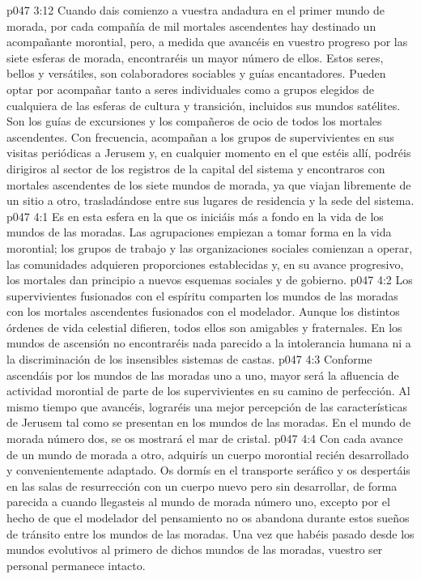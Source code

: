 \vs p047 3:12 Cuando dais comienzo a vuestra andadura en el primer mundo de morada, por cada compañía de mil mortales ascendentes hay destinado un acompañante morontial, pero, a medida que avancéis en vuestro progreso por las siete esferas de morada, encontraréis un mayor número de ellos. Estos seres, bellos y versátiles, son colaboradores sociables y guías encantadores. Pueden optar por acompañar tanto a seres individuales como a grupos elegidos de cualquiera de las esferas de cultura y transición, incluidos sus mundos satélites. Son los guías de excursiones y los compañeros de ocio de todos los mortales ascendentes. Con frecuencia, acompañan a los grupos de supervivientes en sus visitas periódicas a Jerusem y, en cualquier momento en el que estéis allí, podréis dirigiros al sector de los registros de la capital del sistema y encontraros con mortales ascendentes de los siete mundos de morada, ya que viajan libremente de un sitio a otro, trasladándose entre sus lugares de residencia y la sede del sistema.
\vs p047 4:1 Es en esta esfera en la que os iniciáis más a fondo en la vida de los mundos de las moradas. Las agrupaciones empiezan a tomar forma en la vida morontial; los grupos de trabajo y las organizaciones sociales comienzan a operar, las comunidades adquieren proporciones establecidas y, en su avance progresivo, los mortales dan principio a nuevos esquemas sociales y de gobierno.
\vs p047 4:2 Los supervivientes fusionados con el espíritu comparten los mundos de las moradas con los mortales ascendentes fusionados con el modelador. Aunque los distintos órdenes de vida celestial difieren, todos ellos son amigables y fraternales. En los mundos de ascensión no encontraréis nada parecido a la intolerancia humana ni a la discriminación de los insensibles sistemas de castas.
\vs p047 4:3 Conforme ascendáis por los mundos de las moradas uno a uno, mayor será la afluencia de actividad morontial de parte de los supervivientes en su camino de perfección. Al mismo tiempo que avancéis, lograréis una mejor percepción de las características de Jerusem tal como se presentan en los mundos de las moradas. En el mundo de morada número dos, se os mostrará el mar de cristal.
\vs p047 4:4 Con cada avance de un mundo de morada a otro, adquirís un cuerpo morontial recién desarrollado y convenientemente adaptado. Os dormís en el transporte seráfico y os despertáis en las salas de resurrección con un cuerpo nuevo pero sin desarrollar, de forma parecida a cuando llegasteis al mundo de morada número uno, excepto por el hecho de que el modelador del pensamiento no os abandona durante estos sueños de tránsito entre los mundos de las moradas. Una vez que habéis pasado desde los mundos evolutivos al primero de dichos mundos de las moradas, vuestro ser personal permanece intacto.
